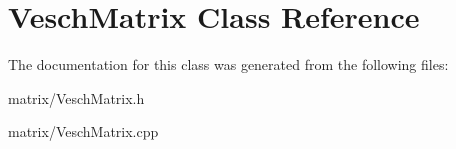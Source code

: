\section{Vesch\+Matrix Class Reference}
\label{class_vesch_matrix}


The documentation for this class was generated from the following files\+:\begin{DoxyCompactItemize}
\item 
matrix/Vesch\+Matrix.\+h\item 
matrix/Vesch\+Matrix.\+cpp\end{DoxyCompactItemize}
